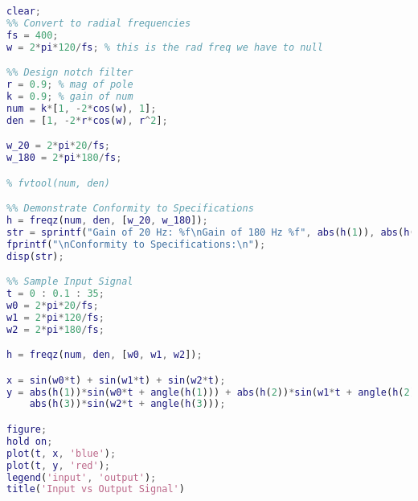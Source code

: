 \documentclass[]{report}
\begin{document}
\begin{lstlisting}[language=Matlab]
clear;
%% Convert to radial frequencies
fs = 400;
w = 2*pi*120/fs; % this is the rad freq we have to null

%% Design notch filter
r = 0.9; % mag of pole
k = 0.9; % gain of num
num = k*[1, -2*cos(w), 1];
den = [1, -2*r*cos(w), r^2];

w_20 = 2*pi*20/fs;
w_180 = 2*pi*180/fs;

% fvtool(num, den)

%% Demonstrate Conformity to Specifications
h = freqz(num, den, [w_20, w_180]);
str = sprintf("Gain of 20 Hz: %f\nGain of 180 Hz %f", abs(h(1)), abs(h(2)));
fprintf("\nConformity to Specifications:\n");
disp(str);

%% Sample Input Signal
t = 0 : 0.1 : 35;
w0 = 2*pi*20/fs;
w1 = 2*pi*120/fs;
w2 = 2*pi*180/fs;

h = freqz(num, den, [w0, w1, w2]);

x = sin(w0*t) + sin(w1*t) + sin(w2*t);
y = abs(h(1))*sin(w0*t + angle(h(1))) + abs(h(2))*sin(w1*t + angle(h(2))) + 
	abs(h(3))*sin(w2*t + angle(h(3)));

figure;
hold on;
plot(t, x, 'blue');
plot(t, y, 'red');
legend('input', 'output');
title('Input vs Output Signal')
\end{lstlisting}
\end{document}
